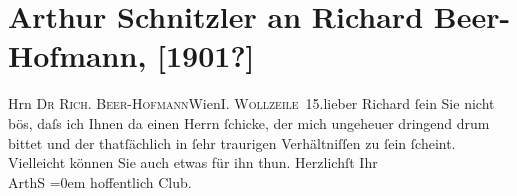 

         
         \renewcommand{\erwaehntePersonen}{Personen:  ?? [Person in traurigen Verhältnissen], Richard Beer-Hofmann}
         \renewcommand{\erwaehnteInstitutionen}{Institutionen: Wiener Schachclub}
         \renewcommand{\erwaehnteOrte}{Orte: Wien, Wollzeile}
         \renewcommand{\erwaehnteWerke}{}
               \section[Arthur Schnitzler an Richard Beer-Hofmann, {[}1901?{]}]{ Arthur Schnitzler an Richard Beer-Hofmann, {[}1901?{]}}\nopagebreak{}\rehead{ }\begin{ledgroupsized}[t]{13cm}\normalsize\beginnumbering{} \toendnotes[C]{\smallbreak\pagebreak[2]} 
\toendnotes[C]{\smallbreak}\pstart{}{\pb}Hrn \textsc{Dr Rich.
                     Beer-Hofmann}\pend{}\pstart{}Wien\pend{}\pstart{}\textsc{I. Wollzeile 15}.\pend{}{\bigskip}\pstart{}{\pb}lieber Richard\pend\pstart
           ſein Sie nicht bös, daſs ich Ihnen da einen Herrn ſchicke, der mich ungeheuer dringend drum bittet und
               der thatſächlich {\pb}in ſehr traurigen Verhältniſſen zu
               ſein ſcheint. Vielleicht können Sie auch etwas für ihn thun.\pend
           \pstart
           {\pb}Herzlichſt Ihr{\\[\baselineskip]}\spacefill\mbox{ArthS}\pend
           \leftskip=0em{}\pstart
           \noindent{}\label{K_L01089-1v}\label{K_L01089-1h} hoffentlich Club.\pend
           
         
         \endnumbering{}\end{ledgroupsized}  \newcommand{\dateiname}{L01089}\newcommand{\titel}{Arthur Schnitzler an Richard Beer-Hofmann, [1901?]}\newcommand{\editorInnen}{Martin Anton Müller und Gerd-Hermann Susen}
      